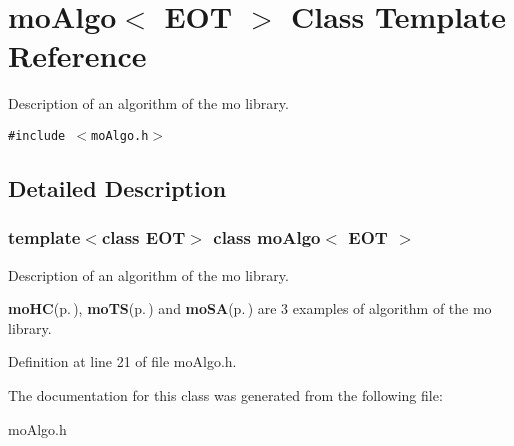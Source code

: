 \section{mo\-Algo$<$ EOT $>$ Class Template Reference}
\label{classmo_algo}
Description of an algorithm of the mo library.  


{\tt \#include $<$mo\-Algo.h$>$}



\subsection{Detailed Description}
\subsubsection*{template$<$class EOT$>$ class mo\-Algo$<$ EOT $>$}

Description of an algorithm of the mo library. 

{\bf mo\-HC}{\rm (p.\,\pageref{classmo_h_c})}, {\bf mo\-TS}{\rm (p.\,\pageref{classmo_t_s})} and {\bf mo\-SA}{\rm (p.\,\pageref{classmo_s_a})} are 3 examples of algorithm of the mo library. 



Definition at line 21 of file mo\-Algo.h.

The documentation for this class was generated from the following file:\begin{CompactItemize}
\item 
mo\-Algo.h\end{CompactItemize}
